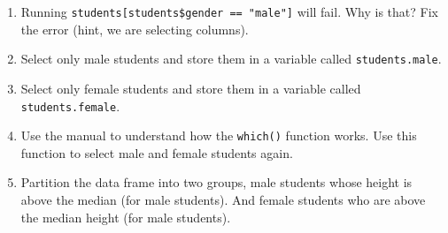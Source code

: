 \documentclass[11pt]{article}
\begin{document}
\begin{enumerate}
\item Running \texttt{students[students\$gender == "male"]} will
  fail. Why is that? Fix the error (hint, we are selecting columns).
\item Select only male students and store them in a variable called \texttt{students.male}.
\item Select only female students and store them in a variable called
  \texttt{students.female}.
\item Use the manual to understand how the \texttt{which()} function
  works. Use this function to select male and female students again.
\item Partition the data frame into two groups, male students whose
  height is above the median (for male students). And female students
  who are above the median height (for male students).
\end{enumerate}
\end{document}

